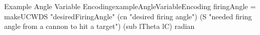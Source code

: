 \begin{pseudohaskell}{Example Angle Variable Encoding}{exampleAngleVariableEncoding}
firingAngle = makeUCWDS "desiredFiringAngle"
    (cn "desired firing angle")
    (S "needed firing angle from a cannon to hit a target")
    (sub lTheta lC)
    radian
\end{pseudohaskell}
